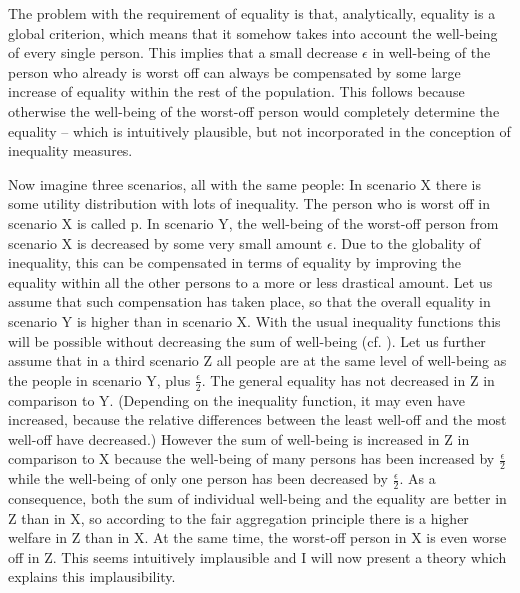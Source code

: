 The problem with the requirement of equality is that, analytically, equality is a global criterion, which means that it somehow takes into account the well-being of every single person. This implies that a small decrease $\epsilon $ in well-being of the person who already is worst off can always be compensated by some large increase of equality within the rest of the population. This follows because otherwise the well-being of the worst-off person would completely determine the equality – which is intuitively plausible, but not incorporated in the conception of inequality measures. 

Now imagine three scenarios, all with the same people: In scenario X there is some utility distribution with lots of inequality. The person who is worst off in scenario X is called p. In scenario Y, the well-being of the worst-off person from scenario X is decreased by some very small amount $\epsilon$. Due to the globality of inequality, this can be compensated in terms of equality by improving the equality within all the other persons to a more or less drastical amount. Let us assume that such compensation has taken place, so that the overall equality in scenario Y is higher than in scenario X. With the usual inequality functions this will be possible without decreasing the sum of well-being (cf. ). Let us further assume that in a third scenario Z all people are at the same level of well-being as the people in scenario Y, plus $\frac{\epsilon}{2}$. The general equality has not decreased in Z in comparison to Y. (Depending on the inequality function, it may even have increased, because the relative differences between the least well-off and the most well-off have decreased.) However the sum of well-being is increased in Z in comparison to X because the well-being of many persons has been increased by $\frac{\epsilon}{2}$ while the well-being of only one person has been decreased by $\frac{\epsilon}{2}$. As a consequence, both the sum of individual well-being and the equality are better in Z than in X, so according to the fair aggregation principle there is a higher welfare in Z than in X. At the same time, the worst-off person in X is even worse off in Z. This seems intuitively implausible and I will now present a theory which explains this implausibility. 



